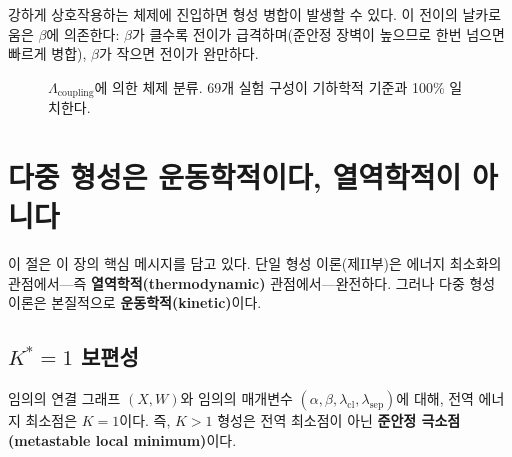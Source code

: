 강하게 상호작용하는 체제에 진입하면 형성 병합이 발생할 수 있다. 이 전이의 날카로움은 $\beta$에 의존한다: $\beta$가 클수록 전이가 급격하며(준안정 장벽이 높으므로 한번 넘으면 빠르게 병합), $\beta$가 작으면 전이가 완만하다.

\begin{center}
\end{center}

\begin{figure}[t]
\centering
{}
\caption{$\Lambda_{\mathrm{coupling}}$에 의한 체제 분류. 69개 실험 구성이 기하학적 기준과 100\% 일치한다.}
\label{fig:regime-phase-diagram}
\end{figure}


\section{다중 형성은 운동학적이다, 열역학적이 아니다}
\label{sec:kinetic-not-thermodynamic}

이 절은 이 장의 핵심 메시지를 담고 있다. 단일 형성 이론(제II부)은 에너지 최소화의 관점에서---즉 \textbf{열역학적(thermodynamic)} 관점에서---완전하다. 그러나 다중 형성 이론은 본질적으로 \textbf{운동학적(kinetic)}이다.

\subsection{$K^* = 1$ 보편성}

\begin{theorem}[$K^* = 1$ 보편성]
\label{thm:k-star-one}
임의의 연결 그래프 $(X, W)$와 임의의 매개변수 $(\alpha, \beta, \lambda_{\mathrm{cl}}, \lambda_{\mathrm{sep}})$에 대해, 전역 에너지 최소점은 $K = 1$이다. 즉, $K > 1$ 형성은 전역 최소점이 아닌 \textbf{준안정 극소점(metastable local minimum)}이다.
\end{theorem}

